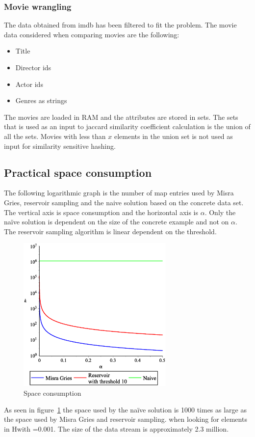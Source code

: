 \subsubsection{Movie wrangling}
The data obtained from imdb has been filtered to fit the problem. The movie data considered when comparing movies are the following:
\begin{itemize}
\item Title
\item Director ids
\item Actor ids
\item Genres as strings
\end{itemize}
The movies are loaded in RAM and the attributes are stored in sets. The sets that is used as an input to jaccard similarity coefficient calculation is the union of all the sets. Movies with less than \(x\) elements in the union set is not used as input for similarity sensitive hashing.

\subsection{Practical space consumption}
The following logarithmic graph is the number of map entries used by Misra Gries, reservoir sampling and the naive solution based on the concrete data set. The vertical axis is space consumption and the horizontal axis is \(\alpha\). Only the naïve solution is dependent on the size of the concrete example and not on \(\alpha\). The reservoir sampling algorithm is linear dependent on the threshold.
\begin{figure}[H]
	\centering
	\includegraphics[width=290px]{img/streamingMemoryGraph.eps}
	\caption{Space consumption}
	\label{fig:space_consumption}
\end{figure}
As seen in figure~\ref{fig:space_consumption} the space used by the naïve solution is 1000 times as large as the space used by Misra Gries and reservoir sampling. when looking for elements in Hwith =0.001. The size of the data stream is approximately 2.3 million.
\\ \\ \\ \\
